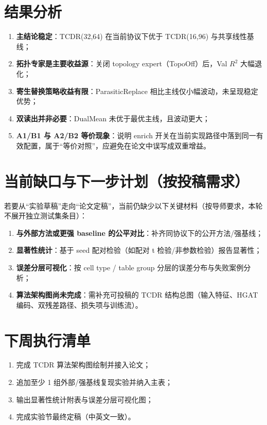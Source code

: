 \documentclass[12pt,a4paper]{ctexart}
\begin{document}
\section{结果分析}
\begin{enumerate}
  \item \textbf{主结论稳定}：TCDR(32,64) 在当前协议下优于 TCDR(16,96) 与共享线性基线；
  \item \textbf{拓扑专家是主要收益源}：关闭 topology expert（TopoOff）后，Val \(R^2\) 大幅退化；
  \item \textbf{寄生替换策略收益有限}：ParasiticReplace 相比主线仅小幅波动，未呈现稳定优势；
  \item \textbf{双读出并非必要}：DualMean 未优于最优主线，且波动更大；
  \item \textbf{A1/B1 与 A2/B2 等价现象}：说明 enrich 开关在当前实现路径中落到同一有效配置，属于“等价对照”，应避免在论文中误写成双重增益。
\end{enumerate}

\section{当前缺口与下一步计划（按投稿需求）}
若要从“实验草稿”走向“论文定稿”，当前仍缺少以下关键材料（按导师要求，本轮不展开独立测试集条目）：
\begin{enumerate}
  \item \textbf{与外部方法或更强 baseline 的公平对比}：补齐同协议下的公开方法/强基线；
  \item \textbf{显著性统计}：基于 seed 配对检验（如配对 t 检验/非参数检验）报告显著性；
  \item \textbf{误差分层可视化}：按 cell type / table group 分层的误差分布与失败案例分析；
  \item \textbf{算法架构图尚未完成}：需补充可投稿的 TCDR 结构总图（输入特征、HGAT 编码、双残差路径、损失项与训练流）。
\end{enumerate}

\section{下周执行清单}
\begin{enumerate}
  \item 完成 TCDR 算法架构图绘制并接入论文；
  \item 追加至少 1 组外部/强基线复现实验并纳入主表；
  \item 输出显著性统计附表与误差分层可视化图；
  \item 完成实验节最终定稿（中英文一致）。
\end{enumerate}
\end{document}
